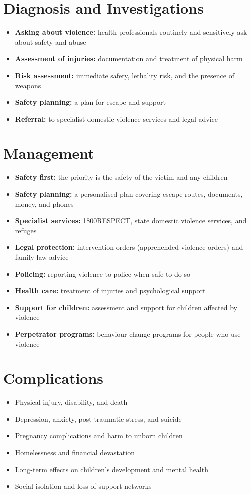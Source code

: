 \section*{Diagnosis and Investigations}
\begin{itemize}
    \item \textbf{Asking about violence:} health professionals routinely and sensitively ask about safety and abuse
    \item \textbf{Assessment of injuries:} documentation and treatment of physical harm
    \item \textbf{Risk assessment:} immediate safety, lethality risk, and the presence of weapons
    \item \textbf{Safety planning:} a plan for escape and support
    \item \textbf{Referral:} to specialist domestic violence services and legal advice
\end{itemize}

\section*{Management}
\begin{itemize}
    \item \textbf{Safety first:} the priority is the safety of the victim and any children
    \item \textbf{Safety planning:} a personalised plan covering escape routes, documents, money, and phones
    \item \textbf{Specialist services:} 1800RESPECT, state domestic violence services, and refuges
    \item \textbf{Legal protection:} intervention orders (apprehended violence orders) and family law advice
    \item \textbf{Policing:} reporting violence to police when safe to do so
    \item \textbf{Health care:} treatment of injuries and psychological support
    \item \textbf{Support for children:} assessment and support for children affected by violence
    \item \textbf{Perpetrator programs:} behaviour-change programs for people who use violence
\end{itemize}

\section*{Complications}
\begin{itemize}
    \item Physical injury, disability, and death
    \item Depression, anxiety, post-traumatic stress, and suicide
    \item Pregnancy complications and harm to unborn children
    \item Homelessness and financial devastation
    \item Long-term effects on children's development and mental health
    \item Social isolation and loss of support networks
\end{itemize}

